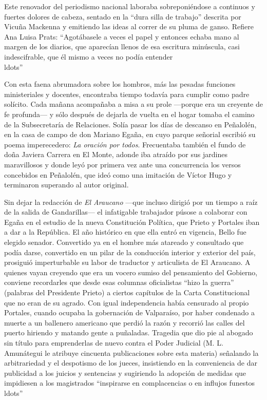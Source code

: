 \documentclass[10pt,twoside,openright]{memoir}
\begin{document}
Este renovador del periodismo nacional laboraba sobreponiéndose a
continuos y fuertes dolores de cabeza, sentado en la ``dura silla de
trabajo'' descrita por Vicuña Mackenna y emitiendo las ideas al correr de
su pluma de ganso. Refiere Ana Luisa Prats: ``Agotábasele a veces el
papel y entonces echaba mano al margen de los diarios, que aparecían
llenos de esa escritura minúscula, casi indescifrable, que él mismo a
veces no podía entender\\ldots''

Con esta faena abrumadora sobre los hombros, más las pesadas funciones
ministeriales y docentes, encontraba tiempo todavía para cumplir como
padre solícito. Cada mañana acompañaba a misa a su prole ---porque era
un creyente de fe profunda--- y sólo después de dejarla de vuelta en el
hogar tomaba el camino de la Subsecretaría de Relaciones. Solía pasar
los días de descanso en Peñalolén, en la casa de campo de don Mariano
Egaña, en cuyo parque señorial escribió su poema imperecedero: \emph{La
oración por todos}. Frecuentaba también el fundo de doña Javiera Carrera
en El Monte, adonde iba atraído por sus jardines maravillosos y donde
leyó por primera vez ante una concurrencia los versos concebidos en
Peñalolén, que ideó como una imitación de Víctor Hugo y terminaron
superando al autor original.

Sin dejar la redacción de \emph{El Araucano} ---que incluso dirigió por un
tiempo a raíz de la salida de Gandarillas--- el infatigable trabajador
púsose a colaborar con Egaña en el estudio de la nueva Constitución
Política, que Prieto y Portales iban a dar a la República. El año
histórico en que ella entró en vigencia, Bello fue elegido senador.
Convertido ya en el hombre más atareado y consultado que podía darse,
convertido en un pilar de la conducción interior y exterior del país,
prosiguió imperturbable su labor de traductor y articulista de El
Araucano. A quienes vayan creyendo que era un vocero sumiso del
pensamiento del Gobierno, conviene recordarles que desde esas columnas
oficialistas ``hizo la guerra'' (palabras del Presidente Prieto) a ciertos
capítulos de la Carta Constitucional que no eran de su agrado. Con igual
independencia había censurado al propio Portales, cuando ocupaba la
gobernación de Valparaíso, por haber condenado a muerte a un ballenero
americano que perdió la razón y recorrió las calles del puerto hiriendo
y matando gente a puñaladas. Tragedia que dio pie al abogado sin título
para emprenderlas de nuevo contra el Poder Judicial (M. L. Amunátegui le
atribuye cincuenta publicaciones sobre esta materia) señalando la
arbitrariedad y el despotismo de los jueces, insistiendo en la
conveniencia de dar publicidad a los juicios y sentencias y sugiriendo
la adopción de medidas que impidiesen a los magistrados ``inspirarse en
complacencias o en influjos funestos\\ldots''
\end{document}
